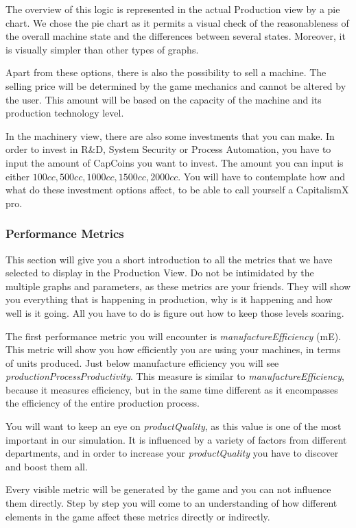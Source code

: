The overview of this logic is represented in the actual Production view by a pie chart. We chose the pie chart as it permits a visual check of the reasonableness of the overall machine state and the differences between several states. Moreover, it is visually simpler than other types of graphs.
 
Apart from these options, there is also the possibility to sell a machine. The selling price will be determined by the game mechanics and cannot be altered by the user. This amount will be based on the capacity of the machine and its production technology level.

In the machinery view, there are also some investments that you can make. In order to invest in R\&D, System Security or Process Automation, you have to input the amount of CapCoins you want to invest. The amount you can input is either $100cc,500cc,1000cc,1500cc,2000cc$. You will have to contemplate how and what do these investment options affect, to be able to call yourself a CapitalismX pro.

\subsubsection{Performance Metrics}
This section will give you a short introduction to all the metrics that we have selected to display in the Production View. Do not be intimidated by the multiple graphs and parameters, as these metrics are your friends. They will show you everything that is happening in production, why is it happening and how well is it going. All you have to do is figure out how to keep those levels soaring. 

The first performance metric you will encounter is \textit{manufactureEfficiency} (\gls{mE}). This metric will show you how efficiently you are using your machines, in terms of units produced.
Just below manufacture efficiency you will see \textit{productionProcessProductivity}. This measure is similar to \textit{manufactureEfficiency}, because it measures efficiency, but in the same time different as it encompasses the efficiency of the entire production process. 

You will want to keep an eye on \textit{productQuality}, as this value is one of the most important in our simulation. It is influenced by a variety of factors from different departments, and in order to increase your \textit{productQuality} you have to discover and  boost them all.

Every visible metric will be generated by the game and you can not influence them directly. Step by step you will come to an understanding of how different elements in the game affect these metrics directly or indirectly.

